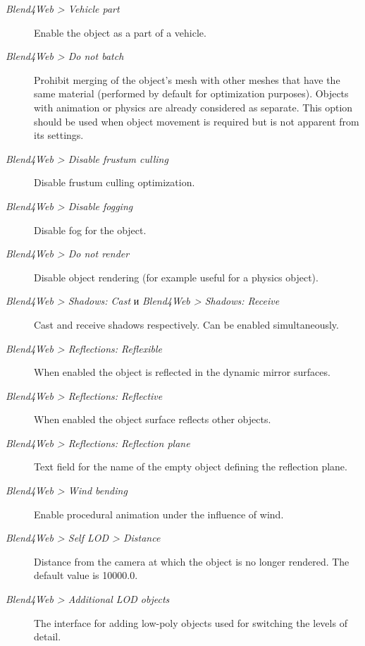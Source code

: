 \documentclass[a4paper,12pt,oneside]{sphinxmanual}
\begin{document}
\begin{description}
\item[{\emph{Blend4Web \textgreater{} Vehicle part}}] \leavevmode
Enable the object as a part of a vehicle.

\item[{\emph{Blend4Web \textgreater{} Do not batch}}] \leavevmode
Prohibit merging of the object's mesh with other meshes that have the same material (performed by default for optimization purposes). Objects with animation or physics are already considered as separate. This option should be used when object movement is required but is not apparent from its settings.

\item[{\emph{Blend4Web \textgreater{} Disable frustum culling}}] \leavevmode
Disable frustum culling optimization.

\item[{\emph{Blend4Web \textgreater{} Disable fogging}}] \leavevmode
Disable fog for the object.

\item[{\emph{Blend4Web \textgreater{} Do not render}}] \leavevmode
Disable object rendering (for example useful for a physics object).

\item[{\emph{Blend4Web \textgreater{} Shadows: Cast} и \emph{Blend4Web \textgreater{} Shadows: Receive}}] \leavevmode
Cast and receive shadows respectively. Can be enabled simultaneously.

\item[{\emph{Blend4Web \textgreater{} Reflections: Reflexible}}] \leavevmode
When enabled the object is reflected in the dynamic mirror surfaces.

\item[{\emph{Blend4Web \textgreater{} Reflections: Reflective}}] \leavevmode
When enabled the object surface reflects other objects.

\item[{\emph{Blend4Web \textgreater{} Reflections: Reflection plane}}] \leavevmode
Text field for the name of the empty object defining the reflection plane.

\item[{\emph{Blend4Web \textgreater{} Wind bending}}] \leavevmode
Enable procedural animation under the influence of wind.

\item[{\emph{Blend4Web \textgreater{} Self LOD \textgreater{} Distance}}] \leavevmode
Distance from the camera at which the object is no longer rendered. The default value is 10000.0.

\item[{\emph{Blend4Web \textgreater{} Additional LOD objects}}] \leavevmode
The interface for adding low-poly objects used for switching the levels of detail.

\end{description}
\end{document}
